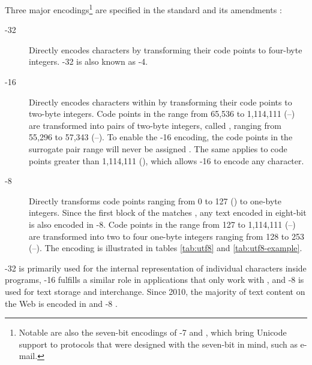 Three major encodings\footnote{
  Notable are also the seven-bit encodings of -7
   and , which bring
  Unicode support to protocols that were designed with the seven-bit
   in mind, such as e-mail.}
are specified in the  standard and its amendments
\cite{iso93:am1,iso93:am2}:
\begin{description}
  \item[-32]Directly
    encodes  characters by transforming their code points to
    four-byte integers. -32 is also known as
    -4.
  \item[-16]
    Directly encodes characters within  by transforming their code
    points to two-byte integers. Code points in the range from 65,536 to
    1,114,111 (\mbox{--}) are transformed into pairs
    of two-byte integers, called , ranging from
    55,296 to 57,343 (\mbox{--}). To enable the
    -16 encoding, the code points in the surrogate pair range
    will never be assigned \cite[sec.\,3.4]{unicode15}. The same applies to code
    points greater than 1,114,111 (), which allows
    -16 to encode any  character.
  \item[-8]
    Directly transforms code points ranging from 0 to 127 () to
    one-byte integers. Since the first  block of the
     matches , any text encoded in eight-bit
     is also encoded in -8. Code points in the
    range from 127 to 1,114,111 (\mbox{--}) are
    transformed into two to four one-byte integers ranging from 128 to 253
    (\mbox{--}). The encoding is illustrated in tables
    \ref{tab:utf8} and \ref{tab:utf8-example}.
\end{description}
-32 is primarily used for the internal representation of
individual  characters inside programs, -16 fulfills
a similar role in applications that only work with , and
-8 is used for text storage and interchange. Since 2010, the
majority of text content on the Web is encoded in  and
-8 \cite{qsuccess15}.

